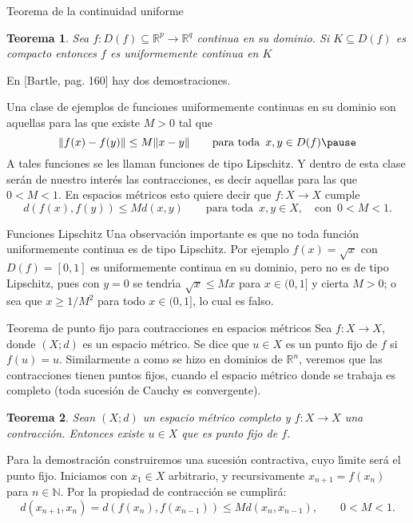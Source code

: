 \documentclass[xcolor=dvipsnames,10pt,handout, draft]{beamer}
\newcommand{\rzp}{\mathbb R^{p}}
\newcommand{\rzq}{\mathbb R^{q}}
\newtheorem*{teo}{Teorema}
\begin{document}
\begin{frame}{Teorema de la continuidad uniforme}

\begin{teo}
Sea $f:D(f)\subseteq\rzp\to\rzq$ continua en su dominio. Si $K\subseteq D(f)$ es compacto entonces $f$ es uniformemente continua en $K$ 
\end{teo}

En [Bartle, pag. 160] hay dos demostraciones. 

\pause\vskip4pt
Una clase de ejemplos de funciones uniformemente continuas en su dominio son aquellas para las que existe $M>0$ tal que
$$\|f(x)-f(y)\|\leq M\|x-y\|\qquad\text{para toda }\,x,y\in D(f)\pause$$
A tales funciones se les llaman {\color{red!77!black}funciones de tipo Lipschitz}.
\vskip4pt\pause
Y dentro de esta clase ser\'an de nuestro inter\'es las {\color{red!77!black}contracciones}, es decir aquellas para las que $0<M<1$.
\vskip4pt\pause
En espacios m\'etricos esto quiere decir que $f:X\to X$ cumple
$$d(f(x),f(y))\leq Md(x,y)\qquad\text{para toda }\,x,y\in X,\quad\text{con }\,0<M<1.$$
\end{frame}



\begin{frame}{Funciones Lipschitz}
Una observaci\'on importante es que {\color{blue!77!black} no toda funci\'on uniformemente continua es de tipo Lipschitz}. \pause\vskip4pt Por ejemplo $f(x)=\sqrt x$ con $D(f)=[0,1]$ es uniformemente continua en su dominio, \pause pero no es de tipo Lipschitz, pues con $y=0$ se tendr\'\i a $\sqrt x\leq M x$ para $x\in(0,1]$ y cierta $M>0$; \pause o sea que $x\geq1/M^2$ para todo $x\in(0,1]$, lo cual es falso.
\end{frame}


\begin{frame}{Teorema de punto fijo para contracciones en espacios m\'etricos}
Sea $f:X\to X$, donde $(X;d)$ es un espacio m\'etrico. 
\vskip4pt\pause
Se dice que $u\in X$ es un {\color{red!77!black} punto fijo} de $f$ si $f(u)=u$.
\pause\vskip4pt
Similarmente a como se hizo en dominios de $\mathbb R^n$, veremos que las contracciones tienen puntos fijos, cuando el espacio m\'etrico donde se trabaja es completo \pause (toda sucesi\'on de Cauchy es convergente).
\begin{teo}
Sean $(X;d)$ un espacio m\'etrico completo y $f:X\to X$ una contracci\'on. Entonces existe $u\in X$ que es punto fijo de $f$.\pause
\end{teo}

Para la demostraci\'on construiremos una sucesi\'on contractiva, cuyo l\'\i mite ser\'a el punto fijo.
\vskip4pt\pause
Iniciamos con $x_1\in X$ arbitrario, y recursivamente $x_{n+1}=f(x_n)$ para $n\in\mathbb N$.
\vskip4pt\pause
Por la propiedad de contracci\'on se cumplir\'a:
$$d(x_{n+1},x_n)=d(f(x_n),f(x_{n-1}))\leq M d(x_n,x_{n-1}),\qquad0<M<1.$$

\end{frame}
\end{document}
